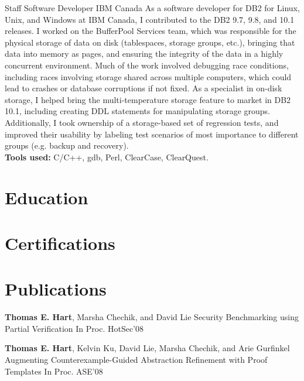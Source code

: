 \documentclass[11pt,letterpaper]{moderncv}
\begin{document}
\vspace*{0.2\baselineskip}
{Staff Software Developer}
{IBM Canada}
{}{}
{
As a software developer for DB2 for Linux, Unix, and Windows at IBM Canada, I contributed to the DB2 9.7, 9.8, and 10.1 releases. I worked on the BufferPool Services team, which was responsible for the physical storage of data on disk (tablespaces, storage groups, etc.), bringing that data into memory as pages, and ensuring the integrity of the data in a highly concurrent environment. Much of the work involved debugging race conditions, including races involving storage shared across multiple computers, which could lead to crashes or database corruptions if not fixed. As a specialist in on-disk storage, I helped bring the multi-temperature storage feature to market in DB2 10.1, including creating DDL statements for manipulating storage groups. Additionally, I took ownership of a storage-based set of regression tests, and improved their usability by labeling test scenarios of most importance to different groups (e.g. backup and recovery). \\
\textbf{Tools used:} C/C++, gdb, Perl, ClearCase, ClearQuest. 
}

\section{Education}

\section{Certifications}

\section{Publications}

{\textbf{Thomas E. Hart}\textnormal{, Marsha Chechik, and David Lie}}
{Security Benchmarking using Partial Verification}
{In Proc. HotSec’08}
{}{}{}

{\textbf{Thomas E. Hart}\textnormal{, Kelvin Ku, David Lie, Marsha Chechik, and Arie Gurfinkel}}
{Augmenting Counterexample-Guided Abstraction Refinement with Proof Templates}
{In Proc. ASE’08}
{}{}{}
\end{document}
